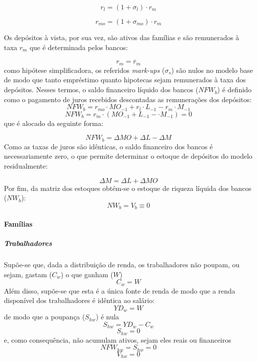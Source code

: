 \begin{equation}
    r_l = (1+\sigma_l)\cdot r_m
\end{equation}

\begin{equation}
    r_{mo} = (1+\sigma_{mo})\cdot r_m
\end{equation}

Os depósitos à vista, por sua vez, são ativos das famílias e são remunerados à taxa $r_m$ que é determinada pelos bancos:

\begin{equation}
    r_m = \overline r_m
\end{equation}
como hipótese simplificadora, os referidos \textit{mark-ups} ($\sigma_s$) são nulos no modelo base de modo que tanto empréstimo quanto hipotecas sejam remunerados à taxa dos depósitos. Nesses termos, o saldo financeiro líquido dos bancos ($NFW_b$) é definido como o pagamento de juros recebidos descontadas as remunerações dos depósitos:
\begin{equation}
    NFW_b = r_{mo}\cdot MO_{-1} + r_l\cdot L_{-1} - r_m\cdot M_{-1}
\end{equation}
$$
    NFW_b = r_{m}\cdot (MO_{-1} + L_{-1} - \cdot M_{-1}) = 0
$$
que é alocado da seguinte forma:

$$
NFW_b = \Delta MO + \Delta L - \Delta M
$$
Como as taxas de juros são idênticas, o saldo financeiro dos bancos é necessariamente zero, o que permite determinar o estoque de depósitos do modelo residualmente:

\begin{equation}
\label{_M}
    \Delta M = \Delta L + \Delta MO
\end{equation}
Por fim, da matriz dos estoques obtém-se o estoque de riqueza líquida dos bancos ($NW_b$):
\begin{equation}
    NW_b = V_b \equiv 0
\end{equation}

\paragraph*{Famílias} 

\subparagraph*{Trabalhadores}

Supõe-se que, dada a distribuição de renda, os trabalhadores não poupam, ou sejam, gastam ($C_w$) o que ganham ($W$)
\begin{equation}
C_w = W
\end{equation}
Além disso, supõe-se que esta é a única fonte de renda de modo que a renda disponível dos trabalhadores é idêntica ao salário:
\begin{equation}
YD_w = W
\end{equation}
de modo que a poupança ($S_{hw}$) é nula 
\begin{equation}
S_{hw} = YD_w - C_w
\end{equation}
$$
S_{hw} = 0
$$
e, como consequência, não acumulam ativos, sejam eles reais ou financeiros
\begin{equation}
NFW_{hw} = S_{hw} = 0
\end{equation}
\begin{equation}
V_{hw} = 0
\end{equation}

